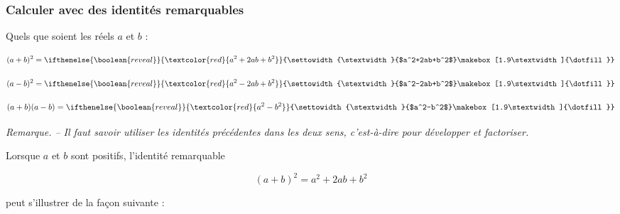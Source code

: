 \documentclass[handout]{beamer}
\newlength{\stextwidth} %
\newcommand{\guessmath}[1]{\ifthenelse{\boolean{reveal}}{\textcolor{red}{#1}}{\settowidth{\stextwidth}{$#1$}\makebox[1.9\stextwidth]{\dotfill}}}
\begin{document}
\title{}

\date{}

\begin{frame}
  \frametitle{Calculer avec des identités remarquables}
  Quels que soient les réels $a$ et $b$ :

  \[(a+b)^2 = \guessmath{a^2+2ab+b^2}\]

  \[(a-b)^2 = \guessmath{a^2-2ab+b^2}\]

  \[(a+b)(a-b) = \guessmath{a^2-b^2}\]

  \bigskip

  \textit{Remarque. -- Il faut savoir utiliser les identités précédentes dans les deux sens, c'est-à-dire pour développer et factoriser.}
\end{frame}

\begin{frame}
  Lorsque $a$ et $b$ sont positifs, l'identité remarquable 

  \[(a+b)^2 = a^2 + 2ab + b^2\]

  peut s'illustrer de la façon suivante :

  \vspace{5cm}
\end{frame}

\end{document}
